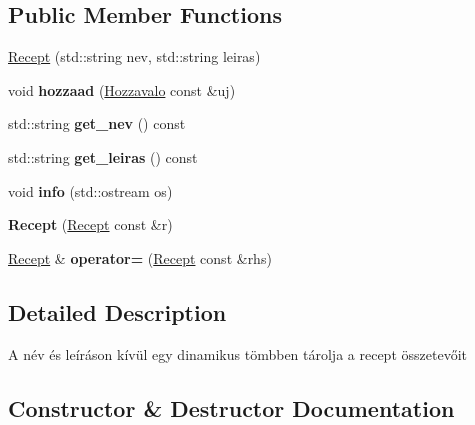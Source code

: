 \subsection*{Public Member Functions}
\begin{DoxyCompactItemize}
\item 
\hyperlink{class_recept_a9cdc66661e60cfe82d1c85e3640b505f}{Recept} (std\+::string nev, std\+::string leiras)
\item 
void {\bfseries hozzaad} (\hyperlink{class_hozzavalo}{Hozzavalo} const \&uj)\hypertarget{class_recept_a24ab7eb66a011f79e99bb2325148382e}{}\label{class_recept_a24ab7eb66a011f79e99bb2325148382e}

\item 
std\+::string {\bfseries get\+\_\+nev} () const \hypertarget{class_recept_a9936225342590bd721f477432fb162f4}{}\label{class_recept_a9936225342590bd721f477432fb162f4}

\item 
std\+::string {\bfseries get\+\_\+leiras} () const \hypertarget{class_recept_a22e27d4afe257de56df8a84a5377f2af}{}\label{class_recept_a22e27d4afe257de56df8a84a5377f2af}

\item 
void {\bfseries info} (std\+::ostream os)\hypertarget{class_recept_a2eccb11470a34650f8faad733960f66e}{}\label{class_recept_a2eccb11470a34650f8faad733960f66e}

\item 
{\bfseries Recept} (\hyperlink{class_recept}{Recept} const \&r)\hypertarget{class_recept_af73dd83922a0f5d9016d450bf1bd5d2c}{}\label{class_recept_af73dd83922a0f5d9016d450bf1bd5d2c}

\item 
\hyperlink{class_recept}{Recept} \& {\bfseries operator=} (\hyperlink{class_recept}{Recept} const \&rhs)\hypertarget{class_recept_adb6db4fde2bc6700b63a8750012be6b8}{}\label{class_recept_adb6db4fde2bc6700b63a8750012be6b8}

\end{DoxyCompactItemize}


\subsection{Detailed Description}
A név és leíráson kívül egy dinamikus tömbben tárolja a recept összetevőit 

\subsection{Constructor \& Destructor Documentation}
